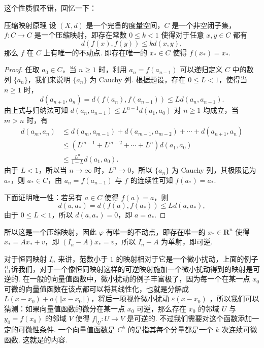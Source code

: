这个性质很不错，回忆一下：

\begin{theorem}{压缩映射原理}{}
    设 $(X,d)$ 是一个完备的度量空间，$C$ 是一个非空闭子集，$f: C\to C$ 是一个压缩映射，即存在常数 $0\leqslant k < 1$ 使得对于任意 $x, y\in C$ 都有 \[d(f(x), f(y))\leqslant kd(x, y),\]那么 $f$ 在 $C$ 上有唯一的不动点. 即存在唯一的 $x_*\in C$ 使得 $f(x_*) = x_*$.
\end{theorem}

\begin{proof}
    任取 $a_0 \in C$，当 $n\geqslant 1$ 时，利用 $a_n = f(a_{n-1})$ 可以递归定义 $C$ 中的数列 $\{a_n\}$，我们来说明 $\{a_n\}$ 为 Cauchy 列. 根据题设，存在 $0\leqslant L <1$，使得当 $n\geqslant 1$ 时，\[d(a_{n+1}, a_n) = d(f(a_n), f(a_{n-1}))\leqslant Ld(a_n, a_{n-1}).\]
    由上式与归纳法可知 $d(a_n,a_{n-1})\leqslant L^{n-1}d(a_1, a_0)$ 对 $n\geqslant 1$ 均成立，当 $m > n$ 时，有
    \[\begin{aligned}
        d(a_m, a_n) & \leqslant d(a_m, a_{m-1}) + d(a_{m-1}, a_{m-2}) + \cdots + d(a_{n+1}, a_n) \\
        & \leqslant (L^{m-1} + L^{m-2} + \cdots + L^{n})d(a_1, a_0) \\
        & \leqslant \frac{L^n}{1-L}d(a_1, a_0).
    \end{aligned}\]
    由于 $L < 1$，所以当 $n\to\infty$ 时，$L^n\to 0$，所以 $\{a_n\}$ 为 Cauchy 列，其极限记为 $a_*$，则 $a_*\in C$，由 $a_n = f(a_{n-1})$ 与 $f$ 的连续性可知 $f(a_*) = a_*$.

    下面证明唯一性：若另有 $a\in C$ 使得 $f(a) = a$，则\[d(a, a_*) = d(f(a), f(a_*))\leqslant Ld(a, a_*),\]由于 $0\leqslant L < 1$，所以 $d(a, a_*) = 0$，即 $a = a_*$.
\end{proof}

所以这是一个压缩映射，因此 $\varphi$ 有唯一的不动点，即存在唯一的 $x_*\in \mathbf{R}^n$ 使得 $x_* = Ax_* + v$，即 $(I_n - A)x_* = v$，所以 $I_n - A$ 为单射，即可逆.

对于恒同映射 $I_n$ 来讲，范数小于 $1$ 的映射相对于它是一个\textrm{微小扰动}，上面的例子告诉我们，对于一个像恒同映射这样的可逆映射施加一个微小扰动得到的映射是可逆的. 在一般的向量值函数中，微小扰动的例子丰富极了，因为每一个在某一点 $x_0$ 可微的向量值函数在该点都可以将其线性化，也就是分解成 $L(x - x_0) + o(\Vert x - x_0\Vert)$，将后一项视作微小扰动 $\varepsilon(x - x_0)$ ，所以我们可以猜测：如果向量值函数的微分在某一点 $x_0$ 可逆，那么存在 $x_0$ 的邻域 $U$ 与 $y_0 = f(x_0)$ 的邻域 $V$ 使得 $\left.f\right|_U: U\to V$ 是可逆的. 不过我们需要对这个函数添加一定的可微性条件. 一个向量值函数是 $C^k$ 的是指其每个分量都是一个 $k$ 次连续可微函数. 这就是的内容.

